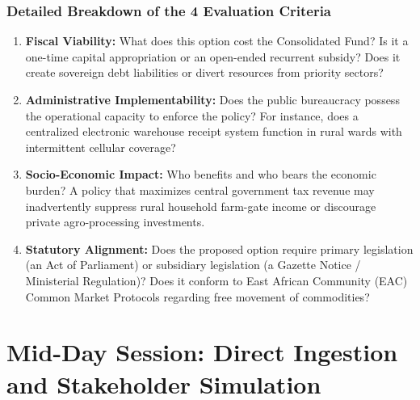 \documentclass[11pt, a4paper]{report}
\begin{document}
\subsection{Detailed Breakdown of the 4 Evaluation Criteria}
\begin{enumerate}[label=\textbf{\arabic*.}]
    \item \textbf{Fiscal Viability:} What does this option cost the Consolidated Fund? Is it a one-time capital appropriation or an open-ended recurrent subsidy? Does it create sovereign debt liabilities or divert resources from priority sectors?
    \item \textbf{Administrative Implementability:} Does the public bureaucracy possess the operational capacity to enforce the policy? For instance, does a centralized electronic warehouse receipt system function in rural wards with intermittent cellular coverage?
    \item \textbf{Socio-Economic Impact:} Who benefits and who bears the economic burden? A policy that maximizes central government tax revenue may inadvertently suppress rural household farm-gate income or discourage private agro-processing investments.
    \item \textbf{Statutory Alignment:} Does the proposed option require primary legislation (an Act of Parliament) or subsidiary legislation (a Gazette Notice / Ministerial Regulation)? Does it conform to East African Community (EAC) Common Market Protocols regarding free movement of commodities?
\end{enumerate}

\vspace{1.5em}
\noindent{}
\vspace{1.5em}

\newpage

\chapter{Mid-Day Session: Direct Ingestion and Stakeholder Simulation}
\end{document}
